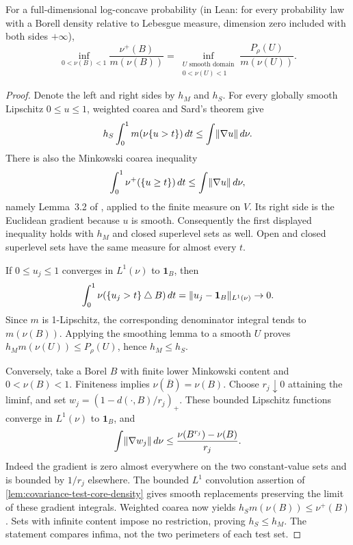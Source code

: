 \begin{lemma}
  \label{lem:relative-perimeter-cheeger-infimum}
  \leanok
  For a full-dimensional log-concave probability (in Lean: for every probability law with a
  Borell density relative to Lebesgue measure, dimension zero included with both sides $+\infty$),
  \[
    \inf_{0<\nu(B)<1}\frac{\nu^+(B)}{m(\nu(B))}
      =\inf_{\substack{U\text{ smooth domain}\\0<\nu(U)<1}}
        \frac{P_\rho(U)}{m(\nu(U))}.
  \]
\end{lemma}
\begin{proof}
  \leanok
  Denote the left and right sides by $h_M$ and $h_S$. For every globally smooth Lipschitz
  $0\le u\le1$, weighted coarea and Sard's theorem give
  \[
    h_S\int_0^1m(\nu\{u>t\})\,dt\le\int\lVert\nabla u\rVert\,d\nu.
  \]
  There is also the Minkowski coarea inequality
  \[
    \int_0^1\nu^+(\{u\ge t\})\,dt\le\int\lVert\nabla u\rVert\,d\nu,
  \]
  namely Lemma~3.2 of \cite{AmbrosioDiMarinoGigli2017Minkowski}, applied to the finite measure
  on $V$. Its right side is the Euclidean gradient because $u$ is smooth. Consequently the
  first displayed inequality holds with $h_M$ and closed superlevel sets as well.
  Open and closed superlevel sets have the same measure for almost every $t$.

  If $0\le u_j\le1$ converges in $L^1(\nu)$ to $\mathbf1_B$, then
  \[
    \int_0^1\nu(\{u_j>t\}\mathbin{\triangle}B)\,dt
      =\lVert u_j-\mathbf1_B\rVert_{L^1(\nu)}\to0.
  \]
  Since $m$ is 1-Lipschitz, the corresponding denominator integral tends to $m(\nu(B))$.
  Applying the smoothing lemma to a smooth $U$ proves
  $h_M m(\nu(U))\le P_\rho(U)$, hence $h_M\le h_S$.

  Conversely, take a Borel $B$ with finite lower Minkowski content and $0<\nu(B)<1$.
  Finiteness implies $\nu(\overline B)=\nu(B)$. Choose $r_j\downarrow0$ attaining the liminf,
  and set $w_j=(1-d(\cdot,B)/r_j)_+$. These bounded Lipschitz functions converge in
  $L^1(\nu)$ to $\mathbf1_B$, and
  \[
    \int\lVert\nabla w_j\rVert\,d\nu
      \le\frac{\nu(B^{r_j})-\nu(B)}{r_j}.
  \]
  Indeed the gradient is zero almost everywhere on the two constant-value sets and is bounded
  by $1/r_j$ elsewhere. The bounded $L^1$ convolution assertion of
  \cref{lem:covariance-test-core-density} gives smooth replacements preserving the limit of
  these gradient integrals. Weighted coarea now yields
  $h_S m(\nu(B))\le\nu^+(B)$. Sets with infinite content impose no restriction, proving
  $h_S\le h_M$. The statement compares infima, not the two perimeters of each test set.
\end{proof}

